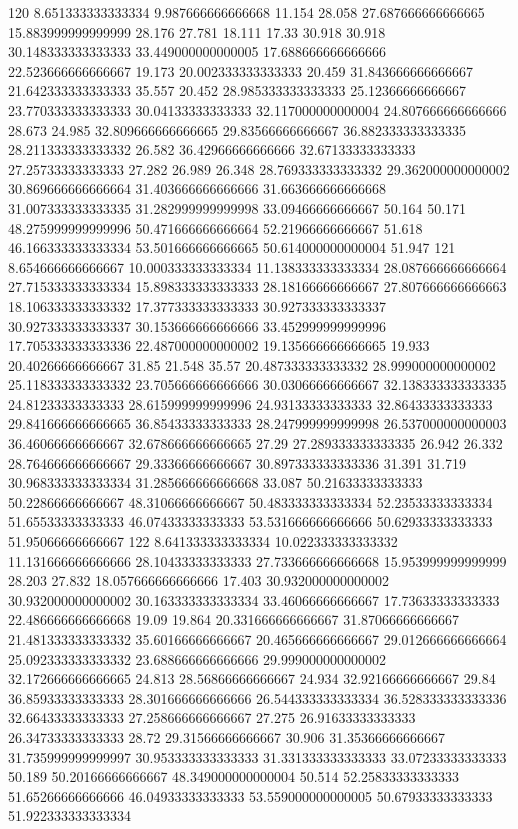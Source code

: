 120 8.651333333333334 9.987666666666668 11.154 28.058 27.687666666666665 15.883999999999999 28.176 27.781 18.111 17.33 30.918 30.918 30.148333333333333 33.449000000000005 17.688666666666666 22.523666666666667 19.173 20.002333333333333 20.459 31.843666666666667 21.642333333333333 35.557 20.452 28.985333333333333 25.12366666666667 23.770333333333333 30.04133333333333 32.117000000000004 24.807666666666666 28.673 24.985 32.809666666666665 29.83566666666667 36.882333333333335 28.211333333333332 26.582 36.42966666666666 32.67133333333333 27.25733333333333 27.282 26.989 26.348 28.769333333333332 29.362000000000002 30.869666666666664 31.403666666666666 31.663666666666668 31.007333333333335 31.282999999999998 33.09466666666667 50.164 50.171 48.275999999999996 50.471666666666664 52.21966666666667 51.618 46.166333333333334 53.501666666666665 50.614000000000004 51.947
121 8.654666666666667 10.000333333333334 11.138333333333334 28.087666666666664 27.715333333333334 15.898333333333333 28.18166666666667 27.807666666666663 18.106333333333332 17.377333333333333 30.927333333333337 30.927333333333337 30.153666666666666 33.452999999999996 17.705333333333336 22.487000000000002 19.135666666666665 19.933 20.40266666666667 31.85 21.548 35.57 20.487333333333332 28.999000000000002 25.118333333333332 23.705666666666666 30.03066666666667 32.138333333333335 24.81233333333333 28.615999999999996 24.93133333333333 32.86433333333333 29.841666666666665 36.85433333333333 28.247999999999998 26.537000000000003 36.46066666666667 32.678666666666665 27.29 27.289333333333335 26.942 26.332 28.764666666666667 29.33366666666667 30.897333333333336 31.391 31.719 30.968333333333334 31.285666666666668 33.087 50.21633333333333 50.22866666666667 48.31066666666667 50.483333333333334 52.23533333333334 51.65533333333333 46.07433333333333 53.531666666666666 50.62933333333333 51.95066666666667
122 8.641333333333334 10.022333333333332 11.131666666666666 28.10433333333333 27.733666666666668 15.953999999999999 28.203 27.832 18.057666666666666 17.403 30.932000000000002 30.932000000000002 30.163333333333334 33.46066666666667 17.73633333333333 22.486666666666668 19.09 19.864 20.331666666666667 31.87066666666667 21.481333333333332 35.60166666666667 20.465666666666667 29.012666666666664 25.092333333333332 23.688666666666666 29.999000000000002 32.172666666666665 24.813 28.56866666666667 24.934 32.92166666666667 29.84 36.85933333333333 28.301666666666666 26.544333333333334 36.528333333333336 32.66433333333333 27.258666666666667 27.275 26.91633333333333 26.34733333333333 28.72 29.31566666666667 30.906 31.35366666666667 31.735999999999997 30.953333333333333 31.331333333333333 33.07233333333333 50.189 50.20166666666667 48.349000000000004 50.514 52.25833333333333 51.65266666666666 46.04933333333333 53.559000000000005 50.67933333333333 51.922333333333334
